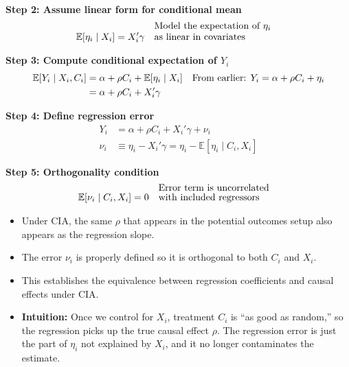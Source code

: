 \documentclass[12pt]{article}
\begin{document}
\vspace{1em}
\noindent \textbf{Step 2: Assume linear form for conditional mean}  
\begin{align}
\mathbb{E}[\eta_i \mid X_i] &= X_i' \gamma && \text{\shortstack[l]{Model the expectation of $\eta_i$ \\ as linear in covariates}}
\end{align}

\vspace{1em}
\noindent \textbf{Step 3: Compute conditional expectation of $Y_i$}  
\begin{align}
\mathbb{E}[Y_i \mid X_i, C_i] 
   &= \alpha + \rho C_i + \mathbb{E}[\eta_i \mid X_i] && \text{\shortstack[l]{From earlier: $Y_i=\alpha+\rho C_i+\eta_i$}} \\
   &= \alpha + \rho C_i + X_i'\gamma 
\end{align}

\vspace{1em}
\noindent \textbf{Step 4: Define regression error}  
\begin{align}
Y_i &= \alpha + \rho C_i + X_i'\gamma + \nu_i \\
\nu_i &\equiv \eta_i - X_i'\gamma = \eta_i - \mathbb{E}[\eta_i \mid C_i, X_i]
\end{align}

\vspace{1em}
\noindent \textbf{Step 5: Orthogonality condition}  
\begin{align}
\mathbb{E}[\nu_i \mid C_i, X_i] &= 0 && \text{\shortstack[l]{Error term is uncorrelated \\ with included regressors}}
\end{align}

\begin{itemize}
    \item Under CIA, the same $\rho$ that appears in the potential outcomes setup also appears as the regression slope.  
    \item The error $\nu_i$ is properly defined so it is orthogonal to both $C_i$ and $X_i$.  
    \item This establishes the equivalence between regression coefficients and causal effects under CIA.  
    \item \textbf{Intuition:} Once we control for $X_i$, treatment $C_i$ is “as good as random,” so the regression picks up the true causal effect $\rho$. The regression error is just the part of $\eta_i$ not explained by $X_i$, and it no longer contaminates the estimate.
\end{itemize}
\end{document}
